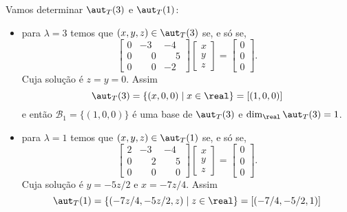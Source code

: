 \begin{exemplo}
\begin{enumerate}[label={\arabic*})]
\begin{solucao}
            Vamos determinar $\aut_T(3)$ e $\aut_T(1)$:
            \begin{itemize}
                \item para $\lambda = 3$ temos que $(x,y,z) \in \aut_T(3)$ se, e s\'o se,
                \[
                    \begin{bmatrix}
                        0 & -3 & -4\\
                        0 & \phantom{-}0 & \phantom{-}5\\
                        0 & \phantom{-}0 & -2
                    \end{bmatrix}\begin{bmatrix}
                        x\\y\\z
                    \end{bmatrix} = \begin{bmatrix}
                        0\\0\\0
                    \end{bmatrix}.
                \]
                Cuja solução é $z = y = 0$. Assim
                \[
                    \aut_T(3) = \{(x,0,0) \mid x \in \real\} = [(1,0,0)]
                \]
                e então $\mathcal{B}_1 = \{(1,0,0)\}$ é uma base de $\aut_T(3)$ e $\dim_\real\aut_T(3) = 1$.
                \item para $\lambda = 1$ temos que $(x,y,z) \in \aut_T(1)$ se, e s\'o se,
                \[
                    \begin{bmatrix}
                        2 & -3 & -4\\
                        0 & \phantom{-}2 & \phantom{-}5\\
                        0 & \phantom{-}0 & \phantom{-}0
                    \end{bmatrix}\begin{bmatrix}
                        x\\y\\z
                    \end{bmatrix} = \begin{bmatrix}
                        0\\0\\0
                    \end{bmatrix}.
                \]
                Cuja solução é $y = -5z/2$ e $x = -7z/4$. Assim
                \[
                    \aut_T(1) = \{(-7z/4,-5z/2,z) \mid z \in \real\} = [(-7/4,-5/2,1)]
\]
\end{itemize}
\end{solucao}
\end{enumerate}
\end{exemplo}
